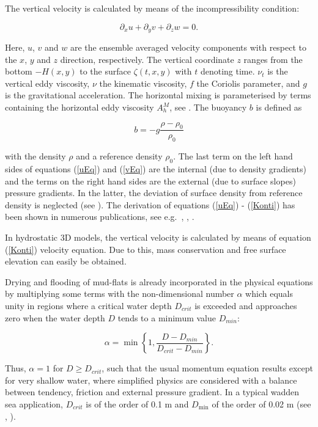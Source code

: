 The vertical velocity is calculated by means of the
incompressibility condition:

\begin{equation}\label{Konti}
\partial_x u +\partial_y v +\partial_z w = 0.
\end{equation}


Here, $u$, $v$ and $w$ are the ensemble averaged
velocity components with respect
to the $x$, $y$ and $z$ direction, respectively.
The vertical coordinate $z$ ranges from the bottom $-H(x,y)$ \label{Hxy}
to the surface $\zeta(t,x,y)$ with $t$ denoting time.
$\nu_t$ is the vertical eddy viscosity, $\nu$ the kinematic viscosity,
$f$ the Coriolis
parameter, and $g$ is the gravitational acceleration.
The horizontal mixing is parameterised by terms containing the
horizontal eddy viscosity $A_h^M$, see \cite{BLUMBERGea87}.  
The buoyancy $b$ is defined as

\begin{equation}\label{bdef}
b=-g\frac{\rho-\rho_0}{\rho_0}
\end{equation}

with the density $\rho$ and a reference density $\rho_0$.
The last term on the left hand sides of equations (\ref{uEq}) and (\ref{vEq})
are the internal (due to density gradients)
and the terms on the right hand sides are the external
(due to surface slopes) pressure gradients. In the latter, the deviation of
surface density from reference density is neglected (see \cite{BURCHARDea97}).
The derivation of equations (\ref{uEq}) - (\ref{Konti}) has been shown in
numerous publications, see e.g.\ \cite{PEDLOSKY87}, \cite{HAIDVOGELea99},
\cite{BURCHARD02}.

In hydrostatic 3D models, the vertical velocity is calculated by means of
equation (\ref{Konti}) velocity equation. 
Due to this, mass conservation and free surface elevation
can easily be obtained.

Drying and flooding of mud-flats is already incorporated in
the physical equations by multiplying some terms with the
non-dimensional number $\alpha$ which equals unity in regions where a
critical water depth $D_{crit}$ is exceeded and approaches zero
when the water depth $D$ tends to a minimum value $D_{min}$:

\begin{equation}\label{alpha}
\alpha=\min\left\{1,\frac{D-D_{min}}{D_{crit}-D_{min}}\right\}.
\end{equation}

Thus, $\alpha=1$ for $D\geq D_{crit}$,  such that the usual momentum
equation results except for very shallow water, where simplified physics
are considered with a balance between tendency, friction and external pressure
gradient. In a typical wadden sea application, $D_{crit}$ is of the order
of 0.1 m and $D_{\min}$ of the order of 0.02 m (see \cite{BURCHARD98},
\cite{BURCHARDea03a}). 


